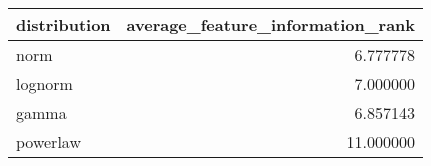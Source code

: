 \begin{tabular}{lr}
\toprule
distribution &  average\_feature\_information\_rank \\
\midrule
        norm &                          6.777778 \\
     lognorm &                          7.000000 \\
       gamma &                          6.857143 \\
    powerlaw &                         11.000000 \\
\bottomrule
\end{tabular}
